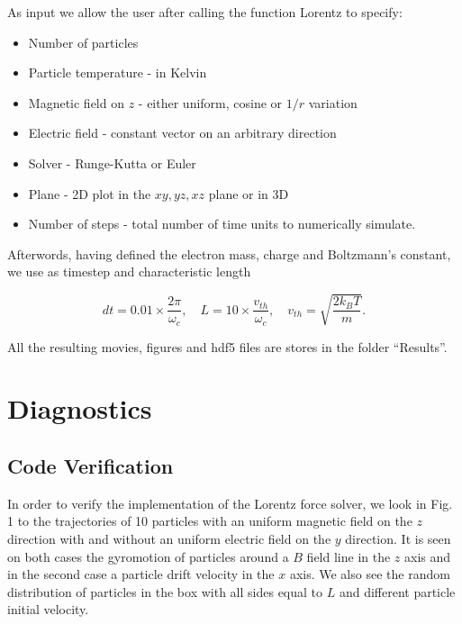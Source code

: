 As input we allow the user after calling the function Lorentz to specify:

\begin{itemize}
\item Number of particles
\item Particle temperature - in Kelvin
\item Magnetic field on $z$ - either uniform, cosine or $1/r$ variation
\item Electric field - constant vector on an arbitrary direction
\item Solver - Runge-Kutta or Euler
\item Plane - 2D plot in the $xy, yz, xz$ plane or in 3D
\item Number of steps - total number of time units to numerically simulate.
\end{itemize}

Afterwords, having defined the electron mass, charge and Boltzmann's constant, we use as timestep and characteristic length

\begin{equation}
dt=0.01 \times \frac{2 \pi}{\omega_c},\quad L=10 \times \frac{v_{th}}{\omega_c}, \quad v_{th}=\sqrt{\frac{2 k_B T}{m}}.
\end{equation}

All the resulting movies, figures and hdf5 files are stores in the folder ``Results''.


\section{Diagnostics}

\subsection{Code Verification}

In order to verify the implementation of the Lorentz force solver, we look in Fig. 1 to the trajectories of 10 particles with an uniform magnetic field on the $z$ direction with and without an uniform electric field on the $y$ direction. It is seen on both cases the gyromotion of particles around a $B$ field line in the $z$ axis and in the second case a particle drift velocity in the $x$ axis. We also see the random distribution of particles in the box with all sides equal to $L$ and different particle initial velocity.

